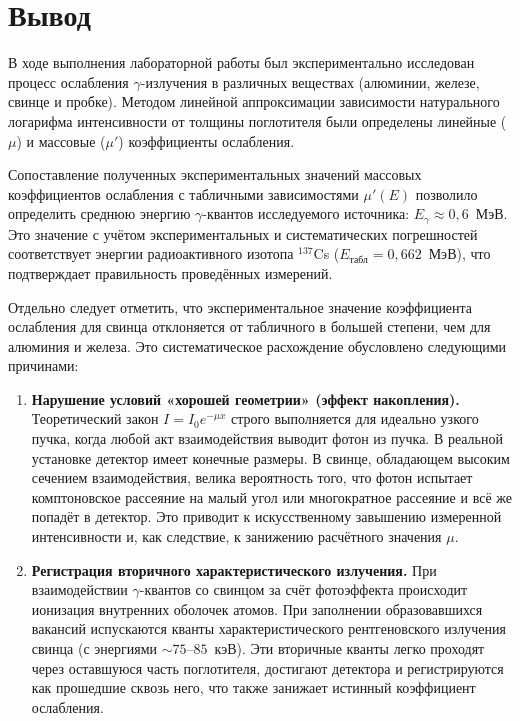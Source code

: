 \documentclass[12pt,a4paper]{article}
\begin{document}
\section*{Вывод}

В ходе выполнения лабораторной работы был экспериментально исследован процесс ослабления $\gamma$-излучения в различных веществах (алюминии, железе, свинце и пробке). Методом линейной аппроксимации зависимости натурального логарифма интенсивности от толщины поглотителя были определены линейные ($\mu$) и массовые ($\mu'$) коэффициенты ослабления.

Сопоставление полученных экспериментальных значений массовых коэффициентов ослабления с табличными зависимостями $\mu'(E)$ позволило определить среднюю энергию $\gamma$-квантов исследуемого источника: $E_\gamma \approx 0{,}6$~МэВ. Это значение с учётом экспериментальных и систематических погрешностей соответствует энергии радиоактивного изотопа $^{137}$Cs ($E_{\text{табл}} = 0{,}662$~МэВ), что подтверждает правильность проведённых измерений.

Отдельно следует отметить, что экспериментальное значение коэффициента ослабления для свинца отклоняется от табличного в большей степени, чем для алюминия и железа. Это систематическое расхождение обусловлено следующими причинами: %

\begin{enumerate}
    \item \textbf{Нарушение условий «хорошей геометрии» (эффект накопления).} Теоретический закон $I = I_0 e^{-\mu x}$ строго выполняется для идеально узкого пучка, когда любой акт взаимодействия выводит фотон из пучка. В реальной установке детектор имеет конечные размеры. В свинце, обладающем высоким сечением взаимодействия, велика вероятность того, что фотон испытает комптоновское рассеяние на малый угол или многократное рассеяние и всё же попадёт в детектор. Это приводит к искусственному завышению измеренной интенсивности и, как следствие, к занижению расчётного значения $\mu$.
    
    \item \textbf{Регистрация вторичного характеристического излучения.} При взаимодействии $\gamma$-квантов со свинцом за счёт фотоэффекта происходит ионизация внутренних оболочек атомов. При заполнении образовавшихся вакансий испускаются кванты характеристического рентгеновского излучения свинца (с энергиями $\sim 75$--$85$~кэВ). Эти вторичные кванты легко проходят через оставшуюся часть поглотителя, достигают детектора и регистрируются как прошедшие сквозь него, что также занижает истинный коэффициент ослабления.
    
\end{enumerate}
\end{document}
